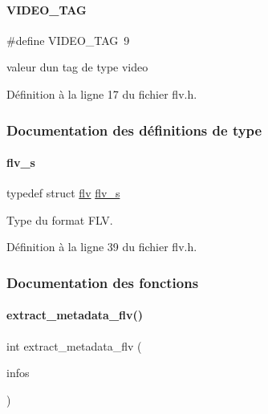 \mbox{\label{a00083_a28dc3cdf4ca8d4d458c3d4c94301b96f}} 
\paragraph{\texorpdfstring{V\+I\+D\+E\+O\+\_\+\+T\+AG}{VIDEO\_TAG}}
{\footnotesize\ttfamily \#define V\+I\+D\+E\+O\+\_\+\+T\+AG~9}

valeur d\textquotesingle{}un tag de type video 

Définition à la ligne 17 du fichier flv.\+h.



\subsubsection{Documentation des définitions de type}
\mbox{\label{a00083_a3b9efa7321ea7018b7209626e444db19}} 
\paragraph{\texorpdfstring{flv\+\_\+s}{flv\_s}}
{\footnotesize\ttfamily typedef struct \hyperlink{a00166}{flv} \hyperlink{a00083_a3b9efa7321ea7018b7209626e444db19}{flv\+\_\+s}}

Type du format F\+LV. 

Définition à la ligne 39 du fichier flv.\+h.



\subsubsection{Documentation des fonctions}
\mbox{\label{a00083_ac1c7c5c1221f121e1c0014efe23b82f8}} 
\paragraph{\texorpdfstring{extract\+\_\+metadata\+\_\+flv()}{extract\_metadata\_flv()}}
{\footnotesize\ttfamily int extract\+\_\+metadata\+\_\+flv (\begin{DoxyParamCaption}\item[{\hyperlink{a00008_aa8ca908d92fb5bdd3c0a9e1f58b2cf03}{info\+\_\+s} $\ast$}]{infos }\end{DoxyParamCaption})}




